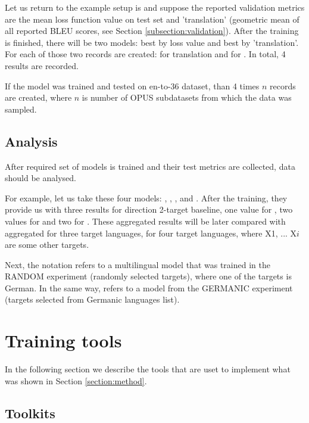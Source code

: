 Let us return to the example setup is  and
suppose the reported validation metrics are the mean loss function value on
test set and 'translation' (geometric mean of all reported BLEU scores,
see Section \ref{subsection:validation}).
After the training is finished, there will be two models: best by
loss value and best by 'translation'.
For each of those two records are created: for  translation
and for . In total, 4 results are recorded.

If the model was trained and tested on \gls{en-to-36} dataset,
than 4 times $n$ records are created, where $n$
is number of OPUS subdatasets from which the data was sampled.


\subsection{Analysis}

After required set of models is trained and their test
metrics are collected, data should be analysed.

For example, let us take these four models: ,
, , and .
After the training, they provide us with three results for 
direction 2-target baseline,
one value for ,
two values for 
and two for .
These aggregated  results will be later compared with
aggregated  for three target languages,
 for four target languages, where X1, ... X$i$ are
some other targets.

Next, the  notation refers to a multilingual
model that was trained in the RANDOM experiment (randomly selected targets),
where one of the targets is German.
In the same way,  refers to a model from
the GERMANIC experiment (targets selected from Germanic languages list).


\section{Training tools}

In the following section we describe the tools that are uset to implement
what was shown in Section \ref{section:method}.

\subsection{Toolkits}

